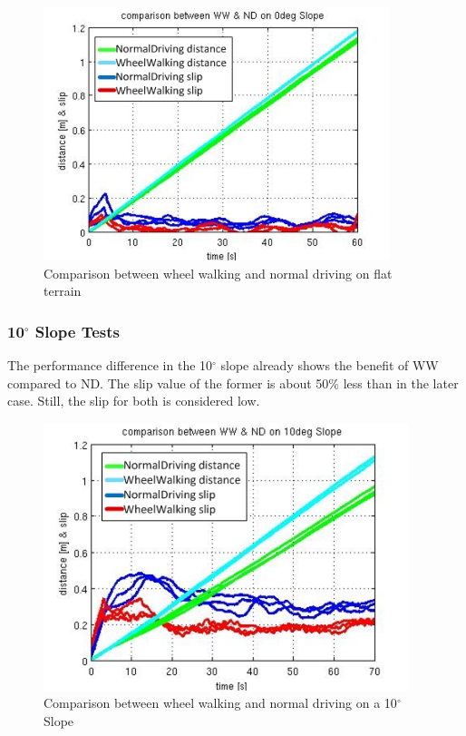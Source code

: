 \documentclass[a4paper,twocolumn]{esapub2005} %
\begin{document}
\begin{figure}[h!]
    \centering
    \includegraphics[width=0.9\textwidth]{00dega2.jpg}
    \caption{Comparison between wheel walking and normal driving on flat terrain}
    \label{fig:00d}
\end{figure}

\subsubsection*{10$^{\circ}$ Slope Tests}
The performance difference in the 10$^\circ$ slope already shows the benefit of
WW compared to ND. The slip value of the former is about 50\% less than in the
later case. Still, the slip for both is considered low.

\begin{figure}[h!]
    \centering
    \includegraphics[width=0.95\textwidth]{10dega2.jpg}	\caption{Comparison between
    wheel walking and normal driving on a 10$^{\circ}$ Slope} \label{fig:10d}
\end{figure}
\end{document}
